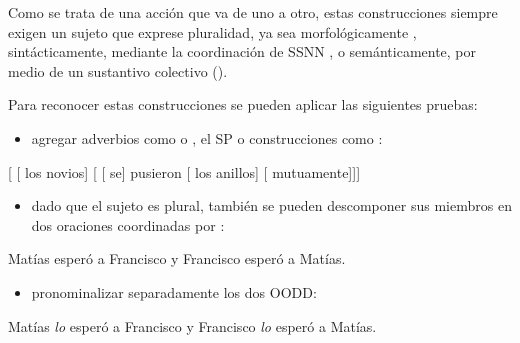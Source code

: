 Como se trata de una acción que va de uno a otro, estas construcciones siempre
exigen un sujeto que exprese pluralidad, ya sea morfológicamente
, sintácticamente, mediante la coordinación de SSNN
, o semánticamente, por medio de un sustantivo colectivo
().

Para reconocer estas construcciones se pueden aplicar las siguientes pruebas:

\begin{itemize}
  \item agregar adverbios como  o , el SP
         o construcciones como :
\end{itemize}

\begin{exe}
  \ex {}[ [ los novios] [ [ se] pusieron [ los anillos]
      [ mutuamente]]]
\end{exe}

\begin{itemize}
  \item dado que el sujeto es plural, también se pueden descomponer sus miembros
        en dos oraciones coordinadas por :
\end{itemize}

\begin{exe}
  \ex Matías esperó a Francisco y Francisco esperó a Matías.
\end{exe}

\begin{itemize}
  \item pronominalizar separadamente los dos OODD:
\end{itemize}

\begin{exe}
  \ex Matías \textit{lo} esperó a Francisco y Francisco \textit{lo} esperó a
      Matías.
\end{exe}

